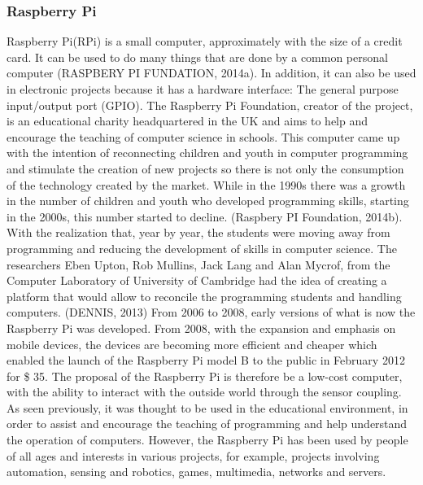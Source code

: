\documentclass{acm_proc_article-sp}
\begin{document}
\subsubsection{Raspberry Pi}
Raspberry Pi(RPi) is a small computer, approximately with the size of a credit card. It can be used to do many things that are done by a common personal computer (RASPBERY PI FUNDATION, 2014a). In addition, it can also be used in electronic projects because it has a hardware interface: The general purpose input/output port (GPIO). The Raspberry Pi Foundation, creator of the project, is an educational charity headquartered in the UK and aims to help and encourage the teaching of computer science in schools.
\newline
\newline
This computer came up with the intention of reconnecting children and youth in computer programming and stimulate the creation of new projects so there is not only the consumption of the technology created by the market. While in the 1990s there was a growth in the number of children and youth who developed programming skills, starting in the 2000s, this number started to decline. (Raspbery PI Foundation, 2014b).
\newline
\newline
With the realization that, year by year, the students were moving away from programming and reducing the development of skills in computer science. The researchers Eben Upton, Rob Mullins, Jack Lang and Alan Mycrof, from the Computer Laboratory of University of Cambridge had the idea of creating a platform that would allow to reconcile the programming students  and handling computers. (DENNIS, 2013) From 2006 to 2008, early versions of what is now the Raspberry Pi was developed. From 2008, with the expansion and emphasis on mobile devices, the devices are becoming more efficient and cheaper which enabled the launch of the Raspberry Pi model B to the public in February 2012 for \$ 35.
\newline
\newline
The proposal of the Raspberry Pi is therefore be a low-cost computer, with the ability to interact with the outside world through the sensor coupling. As seen previously, it was thought to be used in the educational environment, in order to assist and encourage the teaching of programming and help understand the operation of computers. However, the Raspberry Pi has been used by people of all ages and interests in various projects, for example, projects involving automation, sensing and robotics, games, multimedia, networks and servers.
\end{document}
